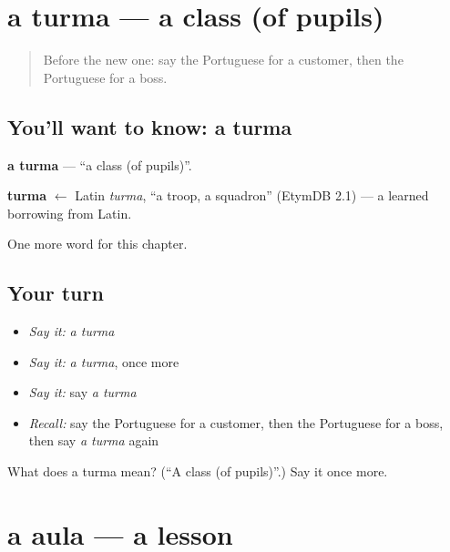 \section[a turma]{a turma — a class (of pupils)}

\label{lesson:PT-C112-turma}



\begin{quote}
Before the new one: say the Portuguese for a customer, then the Portuguese for a boss.
\end{quote}

\subsection*{You'll want to know: a turma}
\textbf{a turma} — \textquotedblleft{}a class (of pupils)\textquotedblright{}.

\begin{cousinweb}
\textbf{turma} $\leftarrow$ Latin \emph{turma}, \textquotedblleft{}a troop, a squadron\textquotedblright{} (EtymDB 2.1) — a learned borrowing from Latin.
\end{cousinweb}

\begin{grammarlens}[title={What you've built}]
One more word for this chapter.
\end{grammarlens}

\subsection*{Your turn}
\begin{itemize}
\raggedright
  \item \emph{Say it:} \emph{a turma}
  \item \emph{Say it:} \emph{a turma}, once more
  \item \emph{Say it:} say \emph{a turma}
  \item \emph{Recall:} say the Portuguese for a customer, then the Portuguese for a boss, then say \emph{a turma} again
\end{itemize}

\begin{tcolorbox}[breakable,colback=teal!4,colframe=teal!35!black,title={Before you move on}]
What does a turma mean? (\textquotedblleft{}A class (of pupils)\textquotedblright{}.) Say it once more.
\end{tcolorbox}
\section[a aula]{a aula — a lesson}

